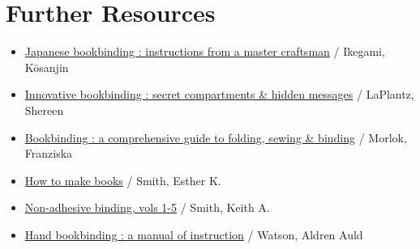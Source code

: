\documentclass[
  openany]{book}
\providecommand{\tightlist}{%
  \setlength{\itemsep}{0pt}\setlength{\parskip}{0pt}}
\begin{document}
\chapter{Further Resources}\label{further-resources-1}

\begin{itemize}
\tightlist
\item
  \href{https://search.worldcat.org/title/11866980}{Japanese bookbinding : instructions from a master craftsman} / Ikegami, Kōsanjin
\item
  \href{https://search.worldcat.org/title/37809087}{Innovative bookbinding : secret compartments \& hidden messages} / LaPlantz, Shereen
\item
  \href{https://search.worldcat.org/title/1047524099}{Bookbinding : a comprehensive guide to folding, sewing \& binding} / Morlok, Franziska
\item
  \href{https://search.worldcat.org/title/123349651}{How to make books} / Smith, Esther K.
\item
  \href{https://search.worldcat.org/title/43303159}{Non-adhesive binding, vols 1-5} / Smith, Keith A.
\item
  \href{https://search.worldcat.org/title/964990}{Hand bookbinding : a manual of instruction} / Watson, Aldren Auld
\end{itemize}
\end{document}
